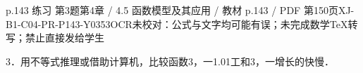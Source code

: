 \begin{bankitem}{p.143 练习 第3题}{第4章 / 4.5 函数模型及其应用 / 教材 p.143 / PDF 第150页}{XJ-B1-C04-PR-P143-Y0353}{OCR未校对：公式与文字均可能有误；未完成数学TeX转写；禁止直接发给学生}
\begin{ocrdraft}
\par
3．用不等式推理或借助计算机，比较函数3，一1.01工和3，一增长的快慢．
\end{ocrdraft}
\end{bankitem}
